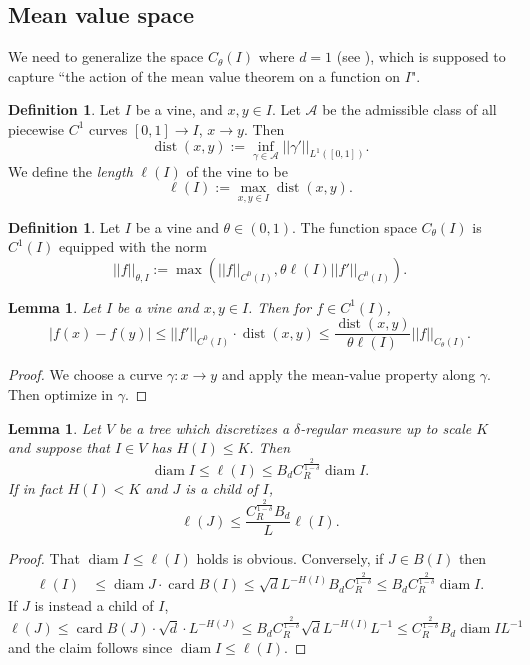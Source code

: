 \documentclass[reqno,10pt]{amsart}
\DeclareMathOperator{\card}{card}
\DeclareMathOperator{\diam}{diam}
\DeclareMathOperator{\dist}{dist}
\newcommand{\dfn}[1]{\emph{#1}\index{#1}}
\newtheorem{lemma}[theorem]{Lemma}
\theoremstyle{definition}
\newtheorem{definition}[theorem]{Definition}
\numberwithin{equation}{section}
\begin{document}
\subsection{Mean value space}
We need to generalize the space $C_\theta(I)$ where $d = 1$ (see \cite[\S2.2]{Dyatlov_2018}), which is supposed to capture ``the action of the mean value theorem on a function on $I$".

\begin{definition}
Let $I$ be a vine, and $x, y \in I$. Let $\mathcal A$ be the admissible class of all piecewise $C^1$ curves $[0, 1] \to I$, $x \to y$. Then 
$$\dist(x, y) := \inf_{\gamma \in \mathcal A} ||\gamma'||_{L^1([0, 1])}.$$
We define the \dfn{length} $\ell(I)$ of the vine to be 
$$\ell(I) := \max_{x, y \in I} \dist(x, y).$$
\end{definition}

\begin{definition}
Let $I$ be a vine and $\theta \in (0, 1)$. The function space $C_\theta(I)$ is $C^1(I)$ equipped with the norm
$$||f||_{\theta, I} := \max\left(||f||_{C^0(I)}, \theta \ell(I) ||f'||_{C^0(I)}\right).$$
\end{definition}

\begin{lemma}
Let $I$ be a vine and $x, y \in I$. Then for $f \in C^1(I)$,
$$|f(x) - f(y)| \leq ||f'||_{C^0(I)} \cdot \dist(x, y) \leq \frac{\dist(x, y)}{\theta \ell(I)} ||f||_{C_\theta(I)}.$$
\end{lemma}
\begin{proof}
We choose a curve $\gamma: x \to y$ and apply the mean-value property along $\gamma$.
Then optimize in $\gamma$.
\end{proof}

\begin{lemma}
Let $V$ be a tree which discretizes a $\delta$-regular measure up to scale $K$ and suppose that $I \in V$ has $H(I) \leq K$.
Then 
$$\diam I \leq \ell(I) \leq B_d C_R^{\frac{2}{1 - \delta}} \diam I.$$
If in fact $H(I) < K$ and $J$ is a child of $I$,
\begin{equation}\label{length of a child}
\ell(J) \leq \frac{C_R^{\frac{2}{1 - \delta}} B_d}{L} \ell(I).
\end{equation}
\end{lemma}
\begin{proof}
That $\diam I \leq \ell(I)$ holds is obvious.
Conversely, if $J \in B(I)$ then
\begin{align*}
\ell(I) &\leq \diam J \cdot \card B(I) \leq \sqrt d L^{-H(I)} B_d C_R^{\frac{2}{1 - \delta}} \leq B_d C_R^{\frac{2}{1 - \delta}} \diam I.
\end{align*}
If $J$ is instead a child of $I$,
$$\ell(J) \leq \card B(J) \cdot \sqrt d \cdot L^{-H(J)} \leq B_d C_R^{\frac{2}{1 - \delta}} \sqrt d L^{-H(I)} L^{-1} \leq C_R^{\frac{2}{1 - \delta}} B_d \diam I L^{-1}$$
and the claim follows since $\diam I \leq \ell(I)$.
\end{proof}
\end{document}
